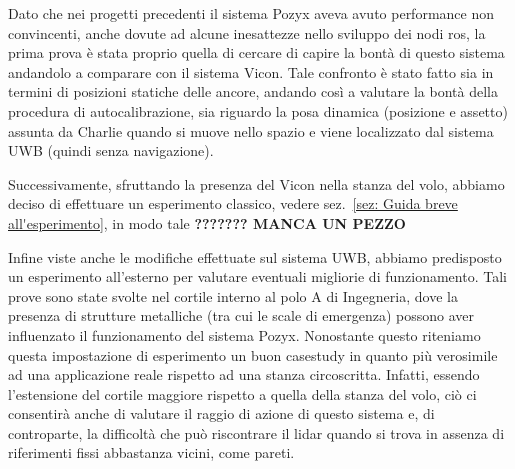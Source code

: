 \vspace{0.5cm}
Dato che nei progetti precedenti il sistema Pozyx aveva avuto performance non convincenti, anche dovute ad alcune inesattezze nello sviluppo dei nodi ros, la prima prova \`e stata proprio quella di cercare di capire la bont\`a di questo sistema andandolo a comparare con il sistema Vicon.
Tale confronto è stato fatto sia in termini di posizioni statiche delle ancore, andando così a valutare la bontà della procedura di autocalibrazione, sia riguardo la posa dinamica (posizione e assetto) assunta da Charlie quando si muove nello spazio e viene localizzato dal sistema UWB (quindi senza navigazione).

Successivamente, sfruttando la presenza del Vicon nella stanza del volo, abbiamo deciso di effettuare un esperimento classico, vedere sez.~\ref{sez: Guida breve all'esperimento}, in modo tale \textbf{??????? MANCA UN PEZZO}

Infine viste anche le modifiche effettuate sul sistema UWB, abbiamo predisposto un esperimento all'esterno per valutare eventuali migliorie di funzionamento.
Tali prove sono state svolte nel cortile interno al polo A di Ingegneria, dove la presenza di strutture metalliche (tra cui le scale di emergenza) possono aver influenzato il funzionamento del sistema Pozyx. 
Nonostante questo riteniamo questa impostazione di esperimento un buon casestudy in quanto pi\`u verosimile ad una applicazione reale rispetto ad una stanza circoscritta. 
Infatti, essendo l'estensione del cortile maggiore rispetto a quella della stanza del volo, ciò ci consentirà anche di valutare il raggio di azione di questo sistema e, di controparte, la difficoltà che può riscontrare il lidar quando si trova in assenza di riferimenti fissi abbastanza vicini, come pareti.

